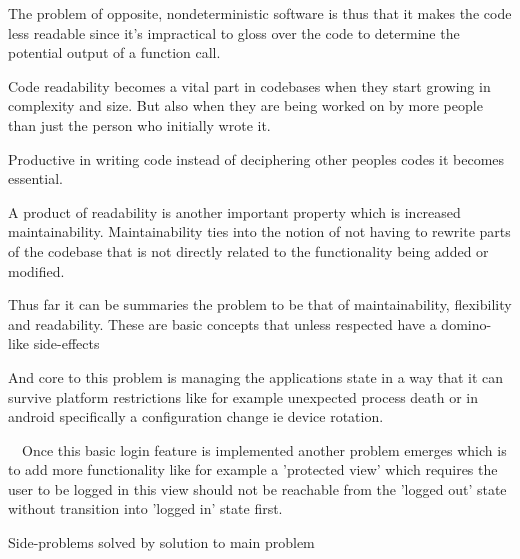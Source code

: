 The problem of opposite, nondeterministic software is thus that it makes the code less readable since
it's impractical to gloss over the code to determine the potential output of a function call.

Code readability becomes a vital part in codebases when they start growing in complexity and size. But also 
when they are being worked on by more people than just the person who initially wrote it.

Productive in writing code instead of deciphering other peoples codes it becomes essential.

A product of readability is another important property which is increased maintainability.
Maintainability ties into the notion of not having to rewrite parts of the codebase
that is not directly related to the functionality being added or modified.

Thus far it can be summaries the problem to be that of maintainability, flexibility and readability.
These are basic concepts that unless respected have a domino-like side-effects 

And core to this problem is managing the applications state in a way that it can survive platform
restrictions like for example unexpected process death or in android specifically a configuration change
ie device rotation.

~~Once this basic login feature is implemented another problem emerges which is to add more functionality
like for example a 'protected view' which requires the user to be logged in 
this view should not be reachable from the 'logged out' state without
transition into 'logged in' state first.~~

Side-problems solved by solution to main problem





